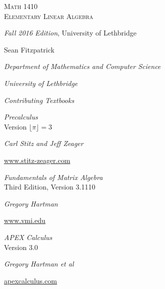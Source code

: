 
\hskip 125pt\begin{minipage}{\textwidth}
\begin{flushright}

\textsc{{\Huge Math 1410 \\
Elementary Linear Algebra}} \\

\bigskip

\textsl{\Large Fall 2016 Edition}, 
{\Large University of Lethbridge}\\


\bigskip

\Large
\vspace{1in}

Sean Fitzpatrick

\emph{\large Department of Mathematics and Computer Science}

\emph{\large University of Lethbridge}\vskip15pt

\parbox{200pt}{\textit{Contributing Textbooks}}\hskip 2cm \phantom{.}

\vspace{0.5in}

\textit{Precalculus}\\
{\large Version $\lfloor \pi\rfloor = 3$}

\emph{\large Carl Stitz and Jeff Zeager}

{\large \href{http://www.stitz-zeager.com}{\underline{www.stitz-zeager.com}}}\vskip 15pt

\textit{Fundamentals of Matrix Algebra}\\
{\large Third Edition, Version 3.1110}

\emph{\large Gregory Hartman}

{\large \href{http://www.vmi.edu/academics/departments/applied-mathematics/affordable-textbooks-apex/}{\underline{www.vmi.edu}}}\vskip 15pt

\textit{APEX Calculus}\\
{\large Version 3.0}

\emph{\large Gregory Hartman et al}

{\large \href{http://www.apexcalculus.com}{\underline{apexcalculus.com}}}\vskip 15pt


\normalsize
\end{flushright}
\end{minipage}

